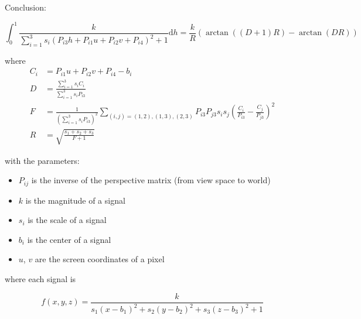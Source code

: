 \documentclass[a3paper, 10pt]{article}
\def\Par#1{ { \left( {#1} \right)} }
\theoremstyle{definition}
\begin{document}
Conclusion:

$$ \int_0^1 \frac k{
	\sum_{i=1}^3 s_i \Par{ P_{i3} h + P_{i1}u + P_{i2}v + P_{i4} }^2
	+ 1
} \mathrm dh = \frac kR \Par{ \arctan((D+1)R) - \arctan(DR) } $$

where
\begin{align*}
	C_i &= P_{i1}u + P_{i2}v + P_{i4} - b_i \\
	D &= \frac{\sum_{i=1}^3 s_i C_i}{\sum_{i=1}^3 s_i P_{i3}} \\
	F &= \frac1{\Par{\sum_{i=1}^3 s_i P_{i3}}^2}
	\sum_{(i,j) = (1,2), (1,3), (2,3)} P_{i3}P_{j3}
	s_is_j \Par{\frac{C_i}{P_{i3}} - \frac{C_j}{P_{j3}}}^2 \\
	R &= \sqrt{\frac{s_1 + s_2 + s_3}{F + 1}}
\end{align*}

with the parameters:

\begin{itemize}
	\item $P_{ij}$ is the inverse of the perspective matrix (from view space to world)
	\item $k$ is the magnitude of a signal
	\item $s_i$ is the scale of a signal
	\item $b_i$ is the center of a signal
	\item $u$, $v$ are the screen coordinates of a pixel
\end{itemize}

where each signal is

$$ f(x, y, z) = \frac k{s_1 (x - b_1)^2 + s_2 (y - b_2)^2 + s_3 (z - b_3)^2 + 1} $$
\end{document}
